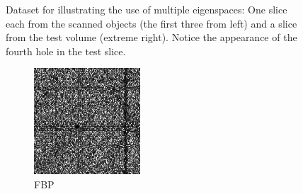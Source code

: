 \documentclass[journal]{IEEEtran}
\begin{document}
\begin{figure}[!h]
\begin{subfigure}[b]{0.235\linewidth}
\captionsetup{labelformat=empty}
        \caption{}
\label{fig:potato_test}
     \end{subfigure}
      \caption{Dataset for illustrating the use of multiple eigenspaces: One slice each from the scanned objects (the first three from left) and a slice from the test volume (extreme right). Notice the appearance of the fourth hole in the test slice. }
\label{fig:potato_data_2D}
\end{figure}

\begin{figure}[!h]
    \begin{subfigure}[b]{0.24\linewidth}
        \includegraphics[width=\textwidth]{../images/potato/post_tci/comparison/weightsIm_fbp30.png}
        \caption{FBP}
    \end{subfigure}
    \begin{subfigure}[b]{0.24\linewidth}

\end{subfigure}
\end{figure}
\end{document}
